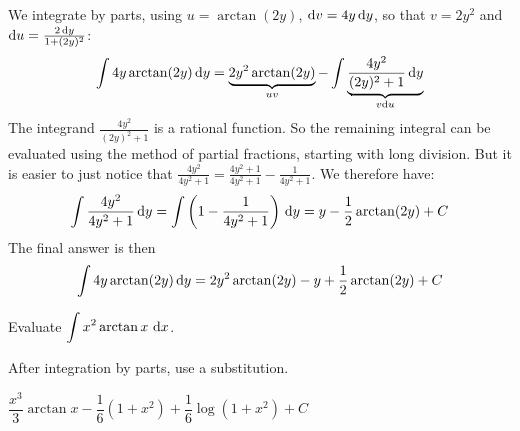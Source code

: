 \begin{solution}
We integrate by parts, using $u = \arctan(2y)$, $\mathrm{d}v = 4y \,\mathrm{d}y$,
so that $v=2y^2$ and $\mathrm{d}u= \frac{2\, \mathrm{d}y}{1+(2y)^2}$:
\begin{align*}
\int 4y\arctan(2y) \,\mathrm{d}y
   = \underbrace{2y^2\arctan(2y)}_{uv} - \int\underbrace{ \frac{4y^2}{(2y)^2+1} \,\mathrm{d}y}_{v\mathrm{d}u}
\end{align*}
The integrand $\frac{4y^2}{(2y)^2+1}$ is a rational function.
            So the remaining integral can be evaluated using the method of partial
            fractions, starting with long division. But it is easier to just notice
            that
$\frac{4y^2}{4y^2+1} = \frac{4y^2+1}{4y^2+1} - \frac{1}{4y^2+1}$.
We therefore have:
\begin{align*}
\int \frac{4y^2}{4y^2+1} \,\mathrm{d}y
  = \int \left(1 - \frac{1}{4y^2+1}\right)\,\mathrm{d}y
  = y - \frac12\arctan(2y) + C
\end{align*}
The final answer is then
\begin{align*}
 \int 4y\arctan(2y) \,\mathrm{d}y
 = 2y^2\arctan(2y) - y + \frac{1}{2}\arctan(2y) + C
\end{align*}
\end{solution}
\begin{Mquestion}
Evaluate $\displaystyle\int x^2\arctan x ~\mathrm{d}x$.
\end{Mquestion}
\begin{hint}
After integration by parts, use a substitution.
\end{hint}
\begin{answer}
$\dfrac{x^3}{3}\arctan x- \dfrac{1}{6}(1+x^2) + \dfrac{1}{6}\log(1+x^2)+C$
\end{answer}
